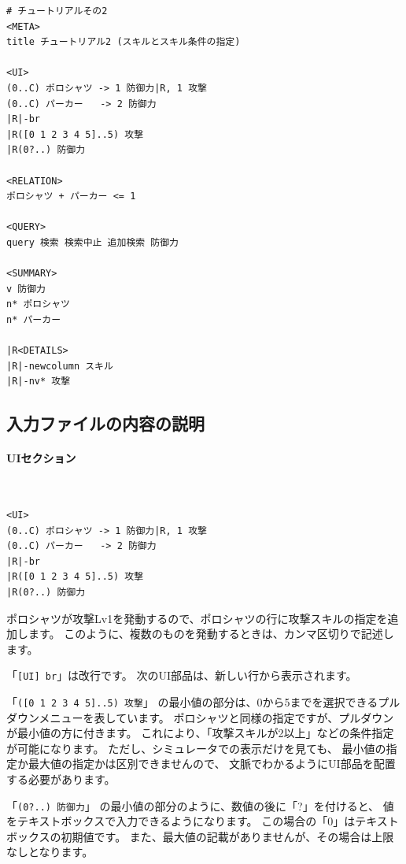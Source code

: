 \documentclass[dvipdfmx]{jsarticle}
\begin{document}
{\footnotesize\begin{mdframed}\begin{Verbatim}[commandchars=|<>]
# チュートリアルその2
<META>
title チュートリアル2 (スキルとスキル条件の指定)

<UI>
(0..C) ポロシャツ -> 1 防御力|R, 1 攻撃
(0..C) パーカー   -> 2 防御力
|R|-br
|R([0 1 2 3 4 5]..5) 攻撃
|R(0?..) 防御力

<RELATION>
ポロシャツ + パーカー <= 1

<QUERY>
query 検索 検索中止 追加検索 防御力

<SUMMARY>
v 防御力
n* ポロシャツ
n* パーカー

|R<DETAILS>
|R|-newcolumn スキル
|R|-nv* 攻撃
\end{Verbatim}
\end{mdframed}}

\subsection{入力ファイルの内容の説明}

\paragraph{UIセクション}~\medskip
{\footnotesize\begin{mdframed}\begin{Verbatim}[commandchars=|<>]
<UI>
(0..C) ポロシャツ -> 1 防御力|R, 1 攻撃
(0..C) パーカー   -> 2 防御力
|R|-br
|R([0 1 2 3 4 5]..5) 攻撃
|R(0?..) 防御力
\end{Verbatim}
\end{mdframed}}
\medskip

ポロシャツが攻撃Lv1を発動するので、ポロシャツの行に攻撃スキルの指定を追加します。
このように、複数のものを発動するときは、カンマ区切りで記述します。

「\texttt{[UI] br}」は改行です。
次のUI部品は、新しい行から表示されます。

「\texttt{([0 1 2 3 4 5]..5) 攻撃}」
の最小値の部分は、0から5までを選択できるプルダウンメニューを表しています。
ポロシャツと同様の指定ですが、プルダウンが最小値の方に付きます。
これにより、「攻撃スキルが2以上」などの条件指定が可能になります。
ただし、シミュレータでの表示だけを見ても、
最小値の指定か最大値の指定かは区別できませんので、
文脈でわかるようにUI部品を配置する必要があります。

「\texttt{(0?..) 防御力}」
の最小値の部分のように、数値の後に「?」を付けると、
値をテキストボックスで入力できるようになります。
この場合の「0」はテキストボックスの初期値です。
また、最大値の記載がありませんが、その場合は上限なしとなります。
\end{document}
